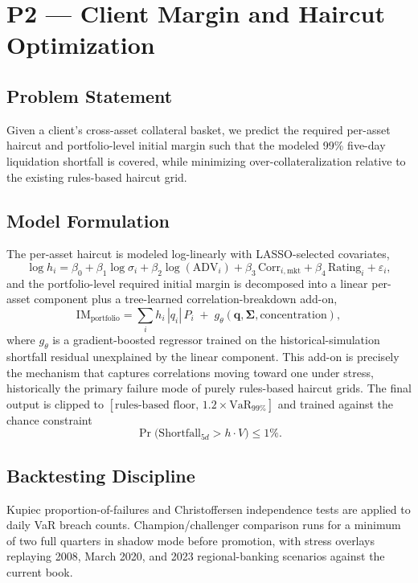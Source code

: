 \documentclass[11pt]{report}
\begin{document}
\chapter{P2 --- Client Margin and Haircut Optimization}

\section{Problem Statement}
Given a client's cross-asset collateral basket, we predict the required per-asset haircut and
portfolio-level initial margin such that the modeled 99\% five-day liquidation shortfall is covered,
while minimizing over-collateralization relative to the existing rules-based haircut grid.

\section{Model Formulation}
The per-asset haircut is modeled log-linearly with LASSO-selected covariates,
\begin{equation}
\log h_i = \beta_0 + \beta_1 \log \sigma_i + \beta_2 \log(\text{ADV}_i) + \beta_3\, \text{Corr}_{i,\text{mkt}} + \beta_4\, \text{Rating}_i + \varepsilon_i,
\end{equation}
and the portfolio-level required initial margin is decomposed into a linear per-asset component plus
a tree-learned correlation-breakdown add-on,
\begin{equation}
\text{IM}_{\text{portfolio}} = \sum_i h_i\,|q_i|\,P_i \;+\; g_\theta(\mathbf{q}, \boldsymbol\Sigma, \text{concentration}),
\end{equation}
where $g_\theta$ is a gradient-boosted regressor trained on the historical-simulation shortfall
residual unexplained by the linear component. This add-on is precisely the mechanism that captures
correlations moving toward one under stress, historically the primary failure mode of purely
rules-based haircut grids. The final output is clipped to $[\text{rules-based floor},\, 1.2\times
\text{VaR}_{99\%}]$ and trained against the chance constraint
\begin{equation}
\Pr\big(\text{Shortfall}_{5d} > h \cdot V\big) \le 1\%.
\end{equation}

\section{Backtesting Discipline}
Kupiec proportion-of-failures and Christoffersen independence tests are applied to daily VaR breach
counts. Champion/challenger comparison runs for a minimum of two full quarters in shadow mode before
promotion, with stress overlays replaying 2008, March 2020, and 2023 regional-banking scenarios
against the current book.
\end{document}
